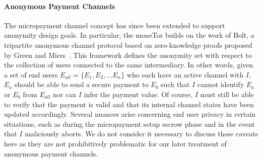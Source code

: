 
\paragraph*{Anonymous Payment Channels} The micropayment channel concept has
since been extended to support anonymity design goals. In particular, the
moneTor builds on the work of Bolt, a tripartite anonymous channel protocol
based on zero-knowledge proofs proposed by Green and Miers~\cite{green2017bolt}.
This framework defines the anonymity set with respect to the collection of users
connected to the same intermediary. In other words, given a set of end users
$E_{all} = \{E_1, E_2, ... E_n\}$ who each have an active channel with $I$,
$E_a$ should be able to send a secure payment to $E_b$ such that $I$ cannot
identify $E_a$ or $E_b$ from $E_{all}$ nor can $I$ infer the payment value. Of
course, $I$ must still be able to verify that the payment is valid and that its
internal channel states have been updated accordingly. Several nuances arise
concerning end user privacy in certain situations, such as during the
micropayment setup escrow phase and in the event that $I$ maliciously aborts. We
do not consider it necessary to discuss these caveats here as they are not
prohibitively problematic for our later treatment of anonymous payment channels.

